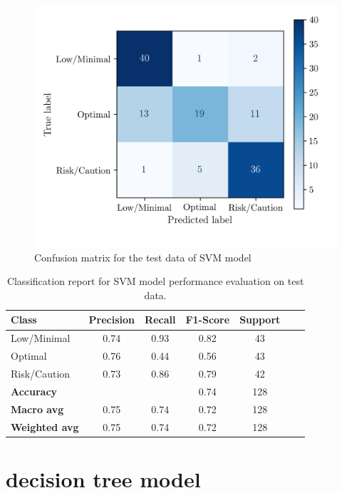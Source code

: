 \documentclass[conference]{IEEEtran}
\begin{document}
\begin{figure}[H]
    \centering
    \includegraphics[width=1\linewidth]{assets/SVM_ConfusionMatrixTest.png}
    \caption{Confusion matrix for the test data of SVM model}
    \label{svm_cm_test}
\end{figure}

\begin{table}[H]
\centering
\caption{Classification report for SVM model performance evaluation on test data.}
\label{crTestSVM}
\begin{tabular}{lcccccc}
\toprule
\textbf{Class} & \textbf{Precision} & \textbf{Recall} & \textbf{F1-Score} & \textbf{Support} \\
\midrule
Low/Minimal & 0.74 & 0.93 & 0.82 & 43 \\
Optimal & 0.76 & 0.44 & 0.56 & 43 \\
Risk/Caution & 0.73 & 0.86 & 0.79 & 42 \\
\midrule
\textbf{Accuracy} &  &  & 0.74 & 128 \\
\textbf{Macro avg} & 0.75 & 0.74 & 0.72 & 128 \\
\textbf{Weighted avg} & 0.75 & 0.74 & 0.72 & 128 \\
\bottomrule
\end{tabular}
\end{table}


\section{decision tree model}
\end{document}
